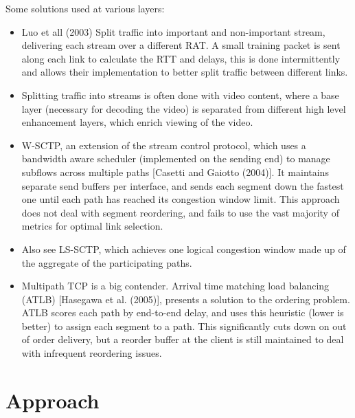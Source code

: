 \documentclass[12pt]{article}
\begin{document}
	Some solutions used at various layers:
	\begin{itemize}
		\item Luo et all (2003) Split traffic into important and non-important stream, delivering each stream over a different RAT. A small training packet is sent along each link to calculate the RTT and delays, this is done intermittently and allows their implementation to better split traffic between different links.
		\item Splitting traffic into streams is often done with video content, where a base layer (necessary for decoding the video) is separated from different high level enhancement layers, which enrich viewing of the video.
		\item W-SCTP, an extension of the stream control protocol, which uses a bandwidth aware scheduler (implemented on the sending end) to manage subflows across multiple paths [Casetti and Gaiotto (2004)]. It maintains separate send buffers per interface, and sends each segment down the fastest one until each path has reached its congestion window limit. This approach does not deal with segment reordering, and fails to use the vast majority of metrics for optimal link selection.
		\item Also see LS-SCTP, which achieves one logical congestion window made up of the aggregate of the participating paths.
		\item Multipath TCP is a big contender. Arrival time matching load balancing (ATLB) [Hasegawa et al. (2005)], presents a solution to the ordering problem. ATLB scores each path by end-to-end delay, and uses this heuristic (lower is better) to assign each segment to a path. This significantly cuts down on out of order delivery, but a reorder buffer at the client is still maintained to deal with infrequent reordering issues.
	\end{itemize}

\section{Approach}
\end{document}
